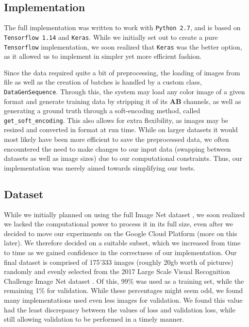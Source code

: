 \documentclass[twoside,twocolumn]{article}
\begin{document}
\subsection{Implementation}

The full implementation was written to work with \texttt{Python 2.7}, and is based on \texttt{Tensorflow 1.14} and \texttt{Keras}. While we initially set out to create a pure \texttt{Tensorflow} implementation, we soon realized that \texttt{Keras} was the better option, as it allowed us to implement in simpler yet more efficient fashion.

Since the data required quite a bit of preprocessing, the loading of images from file as well as the creation of batches is handled by a custom class, \texttt{DataGenSequence}. Through this, the system may load any color image of a given format and generate training data by stripping it of its \textbf{AB} channels, as well as generating a ground truth through a soft-encoding method, called \texttt{get\_soft\_encoding}. This also allows for extra flexibility, as images may be resized and converted in format at run time. While on larger datasets it would most likely have been more efficient to save the preprocessed data, we often encountered the need to make changes to our input data (swapping between datasets as well as image sizes) due to our computational constraints. Thus, our implementation was merely aimed towards simplifying our tests.


\subsection{Dataset}

While we initially planned on using the full Image Net dataset \cite{Imagenet}, we soon realized we lacked the computational power to process it in its full size, even after we decided to move our experiments on the Google Cloud Platform (more on this later). We therefore decided on a suitable subset, which we increased from time to time as we gained confidence in the correctness of our implementation. Our final dataset is comprised of 175’333 images (roughly 20gb worth of pictures) randomly and evenly selected from the 2017 Large Scale Visual Recognition Challenge Image Net dataset \cite{ImNetChallenge:2017}. Of this, 99\% was used as a training set, while the remaining 1\% for validation. While these percentages might seem odd, we found many implementations used even less images for validation. We found this value had the least discrepancy between the values of loss and validation loss, while still allowing validation to be performed in a timely manner.
\end{document}
